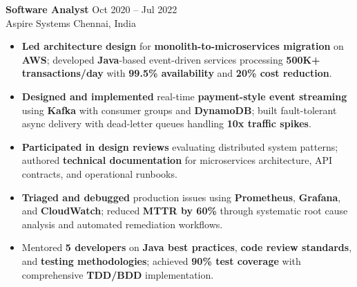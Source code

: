 \documentclass[letterpaper,10pt]{article}
\newcommand{\resumeItem}[1]{\item\small #1}
\newcommand{\resumeSubheading}[4]{
  \vspace{6pt}
  \noindent
  \textbf{#1} \hfill {\footnotesize #2} \\
  [-1pt]
  \noindent
  \small #3 \hfill {\small #4}
  \vspace{3pt}
}
\newcommand{\resumeItemsStart}{\vspace{-2pt}\begin{itemize}}
\newcommand{\resumeItemsEnd}{\end{itemize}\vspace{6pt}}
\begin{document}
\resumeSubheading
{Software Analyst}{Oct 2020 -- Jul 2022}
{Aspire Systems}{Chennai, India}
\resumeItemsStart
\resumeItem{\textbf{Led architecture design} for \textbf{monolith-to-microservices migration} on \textbf{AWS}; developed \textbf{Java}-based event-driven services processing \textbf{500K+ transactions/day} with \textbf{99.5\% availability} and \textbf{20\% cost reduction}.}
\resumeItem{\textbf{Designed and implemented} real-time \textbf{payment-style event streaming} using \textbf{Kafka} with consumer groups and \textbf{DynamoDB}; built fault-tolerant async delivery with dead-letter queues handling \textbf{10x traffic spikes}.}
\resumeItem{\textbf{Participated in design reviews} evaluating distributed system patterns; authored \textbf{technical documentation} for microservices architecture, API contracts, and operational runbooks.}
\resumeItem{\textbf{Triaged and debugged} production issues using \textbf{Prometheus}, \textbf{Grafana}, and \textbf{CloudWatch}; reduced \textbf{MTTR by 60\%} through systematic root cause analysis and automated remediation workflows.}
\resumeItem{Mentored \textbf{5 developers} on \textbf{Java best practices}, \textbf{code review standards}, and \textbf{testing methodologies}; achieved \textbf{90\% test coverage} with comprehensive \textbf{TDD/BDD} implementation.}
\resumeItemsEnd
\vspace{-8pt}


\end{document}
